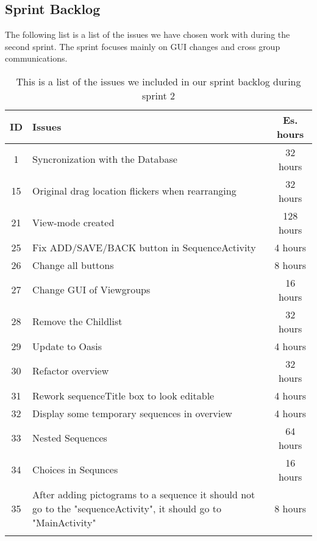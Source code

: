 \subsection{Sprint Backlog}\label{subsec:spr2_sprblog}
The following list is a list of the issues we have chosen work with during the second sprint. The sprint focuses mainly on GUI changes and cross group communications.
\begin{longtable} { | c | p{12cm} | c | } 
\hline
	ID 	&	Issues	&		 Es. hours \\\hline
	1	& 	Syncronization with the Database	&	32 hours	\\\hline
	15	& 	Original drag location flickers when rearranging	&	32 hours	\\\hline
	21	& 	View-mode created	&	128 hours	\\\hline	
	25	& 	Fix ADD/SAVE/BACK button in SequenceActivity	&	4 hours	\\\hline
	26	& 	Change all buttons	&	8 hours	\\\hline
	27	& 	Change GUI of Viewgroups	&	16 hours	\\\hline
	28	& 	Remove the Childlist	&	32 hours	\\\hline
	29	& 	Update to Oasis	&	4 hours	\\\hline
	30	& 	Refactor overview	&	32 hours	\\\hline
	31	& 	Rework sequenceTitle box to look editable	&	4 hours	\\\hline
	32	& 	Display some temporary sequences in overview	&	4 hours	\\\hline
	33 	&	Nested Sequences	&	64 hours \\\hline
	34 	&	Choices in Sequnces	&	16 hours \\\hline
	35  &   After adding pictograms to a sequence it should not go to the "sequenceActivity", it should go to "MainActivity" & 8 hours \\\hline
\caption{This is a list of the issues we included in our sprint backlog during sprint 2}
\label{tab:spr2_sprintblog}
\end{longtable}